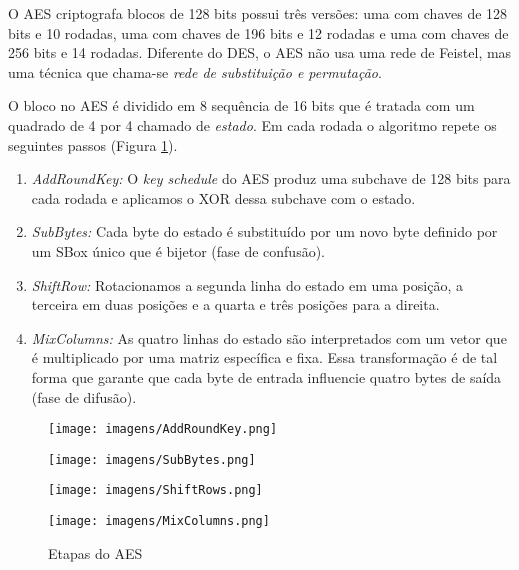 O AES criptografa blocos de 128 bits possui três versões: uma com chaves de 128 bits e 10 rodadas, uma com chaves de 196 bits e 12 rodadas e uma com chaves de 256 bits e 14 rodadas.
Diferente do DES, o AES não usa uma rede de Feistel, mas uma técnica que chama-se {\em rede de substituição e permutação}.

O bloco no AES é dividido em 8 sequência de 16 bits que é tratada com um quadrado de 4 por 4 chamado de {\em estado}.
Em cada rodada o algoritmo repete os seguintes passos (Figura \ref{fig:aes}).

\begin{enumerate}
\item {\em AddRoundKey:} O {\em key schedule} do AES produz uma subchave de 128 bits para cada rodada e aplicamos o XOR dessa subchave com o estado.
\item {\em SubBytes:} Cada byte do estado é substituído por um novo byte definido por um SBox único que é bijetor (fase de confusão).
\item {\em ShiftRow:} Rotacionamos a segunda linha do estado em uma posição, a terceira em duas posições e a quarta e três posições para a direita.
\item {\em MixColumns:} As quatro linhas do estado são interpretados com um vetor que é multiplicado por uma matriz específica e fixa. Essa transformação é de tal forma que garante que cada byte de entrada influencie quatro bytes de saída (fase de difusão). 
\end{enumerate}

\begin{figure}[!htp]
  \centering
  \begin{minipage}{.45\textwidth}
    \centering
    \texttt{[image: imagens/AddRoundKey.png]}  
  \end{minipage}
 \begin{minipage}{.45\textwidth}
    \centering
    \texttt{[image: imagens/SubBytes.png]}
  \end{minipage}
  \begin{minipage}{.45\textwidth}
    \centering
    \texttt{[image: imagens/ShiftRows.png]}  
  \end{minipage}
 \begin{minipage}{.45\textwidth}
    \centering
    \texttt{[image: imagens/MixColumns.png]}
  \end{minipage}
  \caption{Etapas do AES}
  \label{fig:aes}
\end{figure}

